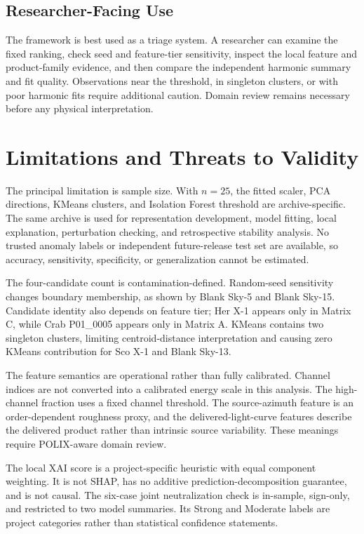 \documentclass[conference]{IEEEtran}
\begin{document}
\subsection{Researcher-Facing Use}

The framework is best used as a triage system. A researcher can examine the fixed ranking, check seed and feature-tier sensitivity, inspect the local feature and product-family evidence, and then compare the independent harmonic summary and fit quality. Observations near the threshold, in singleton clusters, or with poor harmonic fits require additional caution. Domain review remains necessary before any physical interpretation.


\section{Limitations and Threats to Validity}

The principal limitation is sample size. With $n=25$, the fitted scaler, PCA directions, KMeans clusters, and Isolation Forest threshold are archive-specific. The same archive is used for representation development, model fitting, local explanation, perturbation checking, and retrospective stability analysis. No trusted anomaly labels or independent future-release test set are available, so accuracy, sensitivity, specificity, or generalization cannot be estimated.


The four-candidate count is contamination-defined. Random-seed sensitivity changes boundary membership, as shown by Blank Sky-5 and Blank Sky-15. Candidate identity also depends on feature tier; Her X-1 appears only in Matrix C, while Crab P01\_0005 appears only in Matrix A. KMeans contains two singleton clusters, limiting centroid-distance interpretation and causing zero KMeans contribution for Sco X-1 and Blank Sky-13.


The feature semantics are operational rather than fully calibrated. Channel indices are not converted into a calibrated energy scale in this analysis. The high-channel fraction uses a fixed channel threshold. The source-azimuth feature is an order-dependent roughness proxy, and the delivered-light-curve features describe the delivered product rather than intrinsic source variability. These meanings require POLIX-aware domain review.


The local XAI score is a project-specific heuristic with equal component weighting. It is not SHAP, has no additive prediction-decomposition guarantee, and is not causal. The six-case joint neutralization check is in-sample, sign-only, and restricted to two model summaries. Its Strong and Moderate labels are project categories rather than statistical confidence statements.
\end{document}
